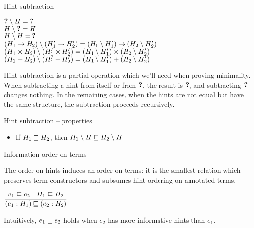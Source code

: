 \documentclass{beamer}
\begin{document}
\begin{frame}{Hint subtraction}

\begin{center}
  $\textbf{?} \setminus H = \textbf{?}$ \\
  $H \setminus \textbf{?} = H$ \\
  $H \setminus H = \textbf{?}$ \\
  $(H_1 \to H_2) \setminus (H'_1 \to H'_2) = (H_1 \setminus H'_1) \to (H_2 \setminus H'_2)$ \\
  $(H_1 \times H_2) \setminus (H'_1 \times H'_2) = (H_1 \setminus H'_1) \times (H_2 \setminus H'_2)$ \\
  $(H_1 + H_2) \setminus (H'_1 + H'_2) = (H_1 \setminus H'_1) + (H_2 \setminus H'_2)$
\end{center}

\vspace{2em}

Hint subtraction is a partial operation which we'll need when proving minimality. When subtracting a hint from itself or from $\textbf{?}$, the result is $\textbf{?}$, and subtracting $\textbf{?}$ changes nothing. In the remaining cases, when the hints are not equal but have the same structure, the subtraction proceeds recursively.

\end{frame}

\begin{frame}{Hint subtraction -- properties}

\begin{itemize}
  \item If $H_1 \sqsubseteq H_2$, then $H_1 \setminus H \sqsubseteq H_2 \setminus H$
\end{itemize}

\end{frame}

\begin{frame}{Information order on terms}

The order on hints induces an order on terms: it is the smallest relation which preserves term constructors and subsumes hint ordering on annotated terms.

\vspace{2em}

\begin{center}
  $\displaystyle \frac{e_1 \sqsubseteq e_2 \quad H_1 \sqsubseteq H_2}{(e_1 : H_1) \sqsubseteq (e_2 : H_2)} \textsc{\footnotesize{}}$
\end{center}

\vspace{2em}

Intuitively, $e_1 \sqsubseteq e_2$ holds when $e_2$ has more informative hints than $e_1$.

\end{frame}
\end{document}
